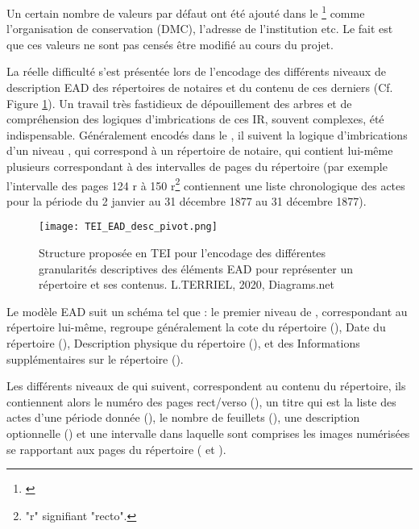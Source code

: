 Un certain nombre de valeurs par défaut ont été ajouté dans le \footnote{\cite{tei_tei_nodate-23}} comme l'organisation de conservation (DMC), l'adresse de l'institution etc. Le fait est que ces valeurs ne sont pas censés être modifié au cours du projet.

La réelle difficulté s'est présentée lors de l'encodage des différents niveaux de description EAD des répertoires de notaires et du contenu de ces derniers (Cf. Figure \ref{fig:TEI_EAD_desc_pivot}). Un travail très fastidieux de dépouillement des arbres et de compréhension des logiques d'imbrications de ces IR, souvent complexes, été indispensable. Généralement encodés dans le , il suivent la logique d'imbrications d'un niveau , qui correspond à un répertoire de notaire, qui contient lui-même plusieurs  correspondant à des intervalles de pages du répertoire (par exemple l'intervalle des pages 124 r à 150 r\footnote{"r" signifiant "recto".} contiennent une liste chronologique des actes pour la période du 2 janvier au 31 décembre 1877 au 31 décembre 1877). 

\begin{figure}[h!]
  \begin{sideways}
    \texttt{[image: TEI\_EAD\_desc\_pivot.png]}
  \end{sideways}
  \centering
  \caption{Structure proposée en TEI pour l'encodage des différentes granularités descriptives des éléments EAD  pour représenter un répertoire et ses contenus. \textcopyright L.TERRIEL, 2020, Diagrams.net}
  \label{fig:TEI_EAD_desc_pivot}
\end{figure}
\clearpage

Le modèle EAD suit un schéma tel que : le premier niveau de , correspondant au répertoire lui-même, regroupe généralement la cote du répertoire (), Date du répertoire (), Description physique du répertoire (), et des Informations supplémentaires sur le répertoire (). 

Les différents niveaux de  qui suivent, correspondent au contenu du répertoire, ils contiennent alors le numéro des pages rect/verso (), un titre qui est la liste des actes d'une période donnée (), le nombre de feuillets (), une description optionnelle () et une intervalle dans laquelle sont comprises les images numérisées se rapportant aux pages du répertoire ( et ).\\

